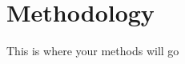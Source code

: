 \documentclass[./dissertation.tex]{subfiles}
\begin{document}
    \chapter{Methodology}
    This is where your methods will go
\end{document}
